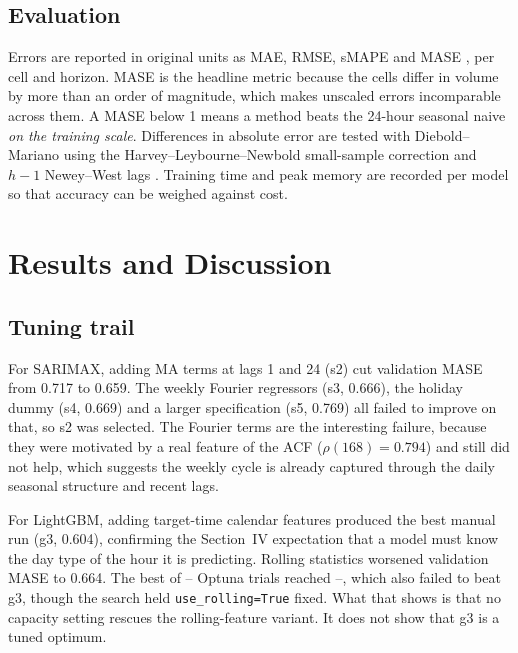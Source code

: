 \documentclass[conference,onecolumn,11pt]{IEEEtran}
\providecommand{\optunaTrials}{--}
\providecommand{\optunaBestMase}{--}
\begin{document}
\begin{table}[t]
\centering\caption{Experiment log (validation split). The rationale column is written \emph{before} each run. The full log with all parameters is in \texttt{experiments/experiment\_log.md}.}\label{tab:log}
\scriptsize
{}
\end{table}

\subsection{Evaluation}
Errors are reported in original units as MAE, RMSE, sMAPE and MASE \cite{hyndman2006}, per cell and horizon. MASE is the headline metric because the cells differ in volume by more than an order of magnitude, which makes unscaled errors incomparable across them. A MASE below 1 means a method beats the 24-hour seasonal naive \emph{on the training scale}. Differences in absolute error are tested with Diebold--Mariano \cite{diebold1995} using the Harvey--Leybourne--Newbold small-sample correction and $h-1$ Newey--West lags \cite{harvey1997}. Training time and peak memory are recorded per model so that accuracy can be weighed against cost.

\section{Results and Discussion}\label{sec:results}
\subsection{Tuning trail}
For SARIMAX, adding MA terms at lags 1 and 24 (s2) cut validation MASE from 0.717 to 0.659. The weekly Fourier regressors (s3, 0.666), the holiday dummy (s4, 0.669) and a larger specification (s5, 0.769) all failed to improve on that, so s2 was selected. The Fourier terms are the interesting failure, because they were motivated by a real feature of the ACF ($\rho(168)=0.794$) and still did not help, which suggests the weekly cycle is already captured through the daily seasonal structure and recent lags.

For LightGBM, adding target-time calendar features produced the best manual run (g3, 0.604), confirming the Section~IV expectation that a model must know the day type of the hour it is predicting. Rolling statistics worsened validation MASE to 0.664. The best of \optunaTrials{} Optuna trials reached \optunaBestMase{}, which also failed to beat g3, though the search held \texttt{use\_rolling=True} fixed. What that shows is that no capacity setting rescues the rolling-feature variant. It does not show that g3 is a tuned optimum.
\end{document}
